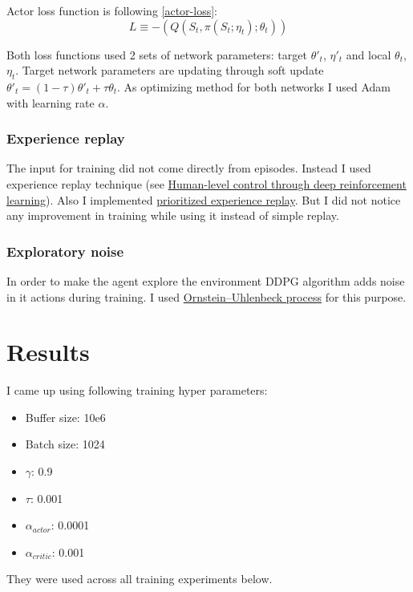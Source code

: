 \documentclass{report}
\begin{document}
Actor loss function is following \ref{actor-loss}:
\begin{equation} \label{actor-loss}
L \equiv -(Q(S_t, \pi(S_t; \eta_t); \theta_t))
\end{equation}

Both loss functions used 2 sets of network parameters: target \(\theta'_t\), \(\eta'_t\) and local \(\theta_t\), \(\eta_t\). Target network parameters are updating through soft update \(\theta'_t = (1 - \tau) \theta'_t + \tau \theta_t\).
As optimizing method for both networks I used Adam with learning rate \(\alpha\).

\subsubsection*{Experience replay}
The input for training did not come directly from episodes. Instead I used experience replay technique (see \href{https://storage.googleapis.com/deepmind-media/dqn/DQNNaturePaper.pdf}{Human-level control through deep reinforcement learning}).
Also I implemented \href{https://arxiv.org/pdf/1511.05952.pdf}{prioritized experience replay}. But I did not notice any improvement in training while using it instead of simple replay.

\subsubsection*{Exploratory noise}
In order to make the agent explore the environment DDPG algorithm adds noise in it actions during training. I used \href{https://en.wikipedia.org/wiki/Ornstein-Uhlenbeck_process}{Ornstein–Uhlenbeck process} for this purpose.


\section*{Results}

I came up using following training hyper parameters:
\begin{itemize}
	\item Buffer size: 10e6
	\item Batch size: 1024
	\item \(\gamma\): 0.9
	\item \(\tau\): 0.001
	\item \(\alpha_{actor}\): 0.0001
	\item \(\alpha_{critic}\): 0.001
\end{itemize}
They were used across all training experiments below.
\end{document}

